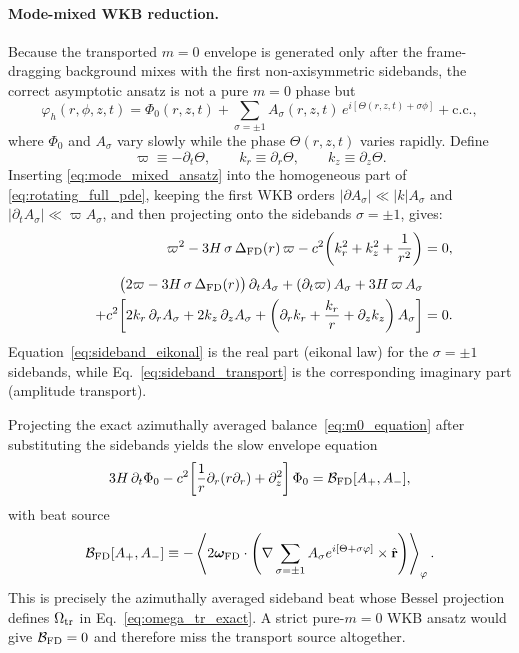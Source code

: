 \documentclass[11pt]{article}
\begin{document}
\paragraph{Mode-mixed WKB reduction.}
Because the transported $m=0$ envelope is generated only after the
frame-dragging background mixes with the first non-axisymmetric sidebands,
the correct asymptotic ansatz is not a pure $m=0$ phase but
\begin{equation}
\varphi_h(r,\phi,z,t)
= \Phi_0(r,z,t)
+ \sum_{\sigma=\pm1}
  A_\sigma(r,z,t)\,e^{i[\Theta(r,z,t)+\sigma\phi]}
+ \text{c.c.},
\label{eq:mode_mixed_ansatz}
\end{equation}
where $\Phi_0$ and $A_\sigma$ vary slowly while the phase
$\Theta(r,z,t)$ varies rapidly.  Define
\begin{equation}
\varpi \equiv -\partial_t\Theta,\qquad
k_r \equiv \partial_r\Theta,\qquad
k_z \equiv \partial_z\Theta.
\label{eq:wkb_defs}
\end{equation}
Inserting \eqref{eq:mode_mixed_ansatz} into the homogeneous part of
\eqref{eq:rotating_full_pde}, keeping the first WKB orders
$|\partial A_\sigma|\ll |k|A_\sigma$ and
$|\partial_t A_\sigma|\ll \varpi A_\sigma$, and then projecting onto the
sidebands $\sigma=\pm1$, gives:
\begin{align}
\varpi^2
- 3H\,\sigma\,\Delta_{\rm FD}(r)\,\varpi
- c^2\!\left(k_r^2+k_z^2+\frac{1}{r^2}\right)
&= 0,
\label{eq:sideband_eikonal}
\\[4pt]
\bigl(2\varpi-3H\,\sigma\,\Delta_{\rm FD}(r)\bigr)\,\partial_t A_\sigma
+ (\partial_t\varpi)\,A_\sigma
+ 3H\,\varpi\,A_\sigma \notag\\
\qquad
+ c^2\!\left[
2k_r\,\partial_r A_\sigma
+ 2k_z\,\partial_z A_\sigma
+ \left(\partial_r k_r + \frac{k_r}{r}
+ \partial_z k_z\right)A_\sigma
\right]
&= 0.
\label{eq:sideband_transport}
\end{align}
Equation~\eqref{eq:sideband_eikonal} is the real part (eikonal law) for
the $\sigma=\pm1$ sidebands, while
Eq.~\eqref{eq:sideband_transport} is the corresponding imaginary part
(amplitude transport).

Projecting the exact azimuthally averaged balance~\eqref{eq:m0_equation}
after substituting the sidebands yields the slow envelope equation
\begin{equation}
3H\,\partial_t \Phi_0
- c^2\!\left[
\frac{1}{r}\partial_r(r\partial_r)
+ \partial_z^2
\right]\Phi_0
= \mathcal{B}_{\rm FD}[A_+,A_-],
\label{eq:envelope_beat}
\end{equation}
with beat source
\begin{equation}
\mathcal{B}_{\rm FD}[A_+,A_-]
\equiv
-\left\langle
2\bm{\omega}_{\rm FD}\cdot
\left(
\nabla\sum_{\sigma=\pm1}
A_\sigma e^{i[\Theta+\sigma\varphi]}
\times\hat{\mathbf r}
\right)
\right\rangle_\varphi .
\label{eq:beat_source_def}
\end{equation}
This is precisely the azimuthally averaged sideband beat whose Bessel
projection defines $\Omega_{\rm tr}$ in
Eq.~\eqref{eq:omega_tr_exact}.  A strict pure-$m=0$ WKB ansatz would give
$\mathcal{B}_{\rm FD}=0$ and therefore miss the transport source
altogether.
\end{document}
